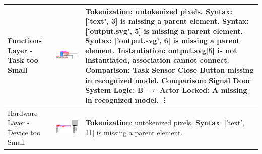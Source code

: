 \begin{longtable}{p{} >{\raggedright\arraybackslash}m{} >{\raggedright\arraybackslash}m{}}
    \bottomrule
    \endlastfoot
    Functions Layer - Task too Small &  \includegraphics[width=\linewidth]{pictures/20_task_too_small_output_clip.png} & \textbf{Tokenization}: untokenized pixels. \newline
        \textbf{Syntax}: ['text', 3] is missing a parent element. \newline
        \textbf{Syntax}: ['output.svg', 5] is missing a parent element. \newline
        \textbf{Syntax}: ['output.svg', 6] is missing a parent element. \newline
        \textbf{Instantiation}: output.svg[5] is not instantiated, association cannot connect. \newline
        \textbf{Comparison}: Task Sensor Close Button missing in recognized model. \newline
        \textbf{Comparison}: Signal Door System Logic: B $\rightarrow$ Actor Locked: A missing in recognized model. \newline
        \vdots \\
    \midrule
    Hardware Layer - Device too Small &  \includegraphics[width=\linewidth]{pictures/21_device_too_small_output_clip.png} & \textbf{Tokenization}: untokenized pixels. \newline
        \textbf{Syntax}: ['text', 11] is missing a parent element. \newline

\end{longtable}
